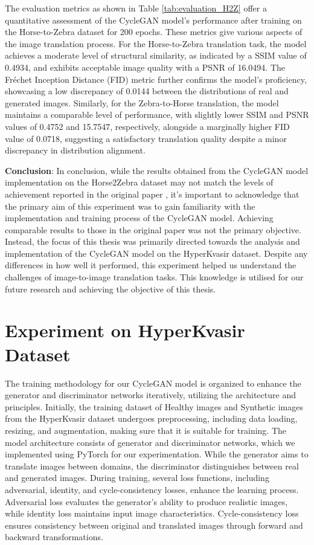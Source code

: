 \documentclass[UKenglish,12pt]{master-style}
\begin{document}
The evaluation metrics as shown in Table \ref{tab:evaluation_H2Z} offer a quantitative assessment of the CycleGAN model's performance after training on the Horse-to-Zebra dataset for 200 epochs. These metrics give various aspects of the image translation process. For the Horse-to-Zebra translation task, the model achieves a moderate level of structural similarity, as indicated by a SSIM value of 0.4934, and exhibits acceptable image quality with a PSNR of 16.0494. The Fréchet Inception Distance (FID) metric further confirms the model's proficiency, showcasing a low discrepancy of 0.0144 between the distributions of real and generated images. Similarly, for the Zebra-to-Horse translation, the model maintains a comparable level of performance, with slightly lower SSIM and PSNR values of 0.4752 and 15.7547, respectively, alongside a marginally higher FID value of 0.0718, suggesting a satisfactory translation quality despite a minor discrepancy in distribution alignment.

\textbf{Conclusion}:
In conclusion, while the results obtained from the CycleGAN model implementation on the Horse2Zebra dataset may not match the levels of achievement reported in the original paper \cite{unpaired_horse2zebra_cyclgan}, it's important to acknowledge that the primary aim of this experiment was to gain familiarity with the implementation and training process of the CycleGAN model. Achieving comparable results to those in the original paper was not the primary objective. Instead, the focus of this thesis was primarily directed towards the analysis and implementation of the CycleGAN model on the HyperKvasir dataset. Despite any differences in how well it performed, this experiment helped us understand the challenges of image-to-image translation tasks. This knowledge is utilised for our  future research and achieving the objective of this thesis.

\section{Experiment on HyperKvasir Dataset}

The training methodology for our CycleGAN model is organized to enhance the generator and discriminator networks iteratively, utilizing the architecture and principles. Initially, the training dataset of Healthy images and Synthetic images from the HyperKvasir dataset undergoes preprocessing, including data loading, resizing, and augmentation, making sure that it is suitable for training. The model architecture consists of generator and discriminator networks, which we implemented using PyTorch for our experimentation. While the generator aims to translate images between domains, the discriminator distinguishes between real and generated images. During training, several loss functions, including adversarial, identity, and cycle-consistency losses, enhance the learning process. Adversarial loss evaluates the generator's ability to produce realistic images, while identity loss maintains input image characteristics. Cycle-consistency loss ensures consistency between original and translated images through forward and backward transformations.
\end{document}
